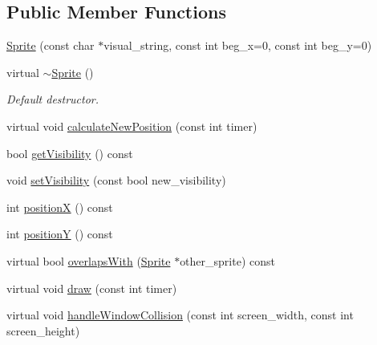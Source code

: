 \subsection*{Public Member Functions}
\begin{DoxyCompactItemize}
\item 
\hyperlink{classSprite_aa9bd46689aaa0c9d5cf102fa153c8554}{Sprite} (const char $\ast$visual\+\_\+string, const int beg\+\_\+x=0, const int beg\+\_\+y=0)
\item 
virtual \hyperlink{classSprite_a8accab430f9d90ae5117b57d67e32b84}{$\sim$\+Sprite} ()
\begin{DoxyCompactList}\small\item\em Default destructor. \end{DoxyCompactList}\item 
virtual void \hyperlink{classSprite_a280f80ec30e7d237e3d1380dab27dd31}{calculate\+New\+Position} (const int timer)
\item 
bool \hyperlink{classSprite_a47ac98fad52841eb22a62f6854f66e1f}{get\+Visibility} () const
\item 
void \hyperlink{classSprite_ac0df5147803b139aa433b33eb2a42246}{set\+Visibility} (const bool new\+\_\+visibility)
\item 
int \hyperlink{classSprite_aad0915304f3b279846eb9868c6651d1a}{positionX} () const
\item 
int \hyperlink{classSprite_a58b317b273657123c3050114d5e50d1b}{positionY} () const
\item 
virtual bool \hyperlink{classSprite_a631928eb8d8fabce4f888c6ed76c0885}{overlaps\+With} (\hyperlink{classSprite}{Sprite} $\ast$other\+\_\+sprite) const
\item 
virtual void \hyperlink{classSprite_aa41512617e8a1626bade15cbbdfb3f79}{draw} (const int timer)
\item 
virtual void \hyperlink{classSprite_a88935cd050a81898ee3a5693038f1a7a}{handle\+Window\+Collision} (const int screen\+\_\+width, const int screen\+\_\+height)
\end{DoxyCompactItemize}
